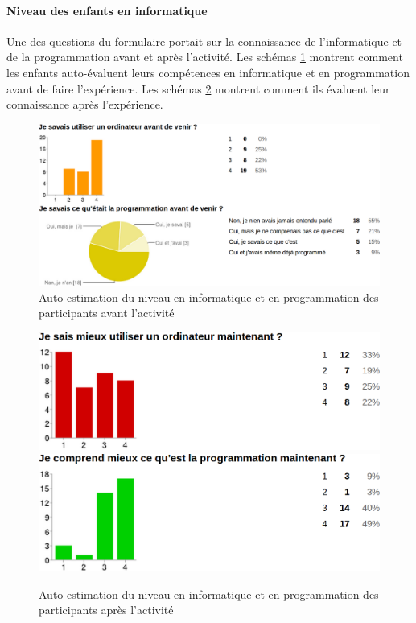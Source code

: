 \paragraph{Niveau des enfants en informatique}
Une des questions du formulaire portait sur la connaissance de l'informatique et de la programmation avant et après l'activité. Les schémas \ref{fig:niveau-avant} montrent comment les enfants auto-évaluent leurs compétences en informatique et en programmation avant de faire l'expérience. Les schémas \ref{fig:niveau-apres} montrent comment ils évaluent leur connaissance après l'expérience.
\begin{figure}[]
  \begin{center}
    \includegraphics[width=\textwidth]{content/8-validation/images/avant-programmation}
    \caption{Auto estimation du niveau en informatique et en programmation des participants avant l'activité}
    \label{fig:niveau-avant}
  \end{center}
\end{figure}
\begin{figure}[]
  \begin{center}
    \includegraphics[width=\textwidth]{content/8-validation/images/apres}
    \includegraphics[width=\textwidth]{content/8-validation/images/apres-programmation}
    \caption{Auto estimation du niveau en informatique et en programmation des participants après l'activité}
    \label{fig:niveau-apres}
  \end{center}
\end{figure}

